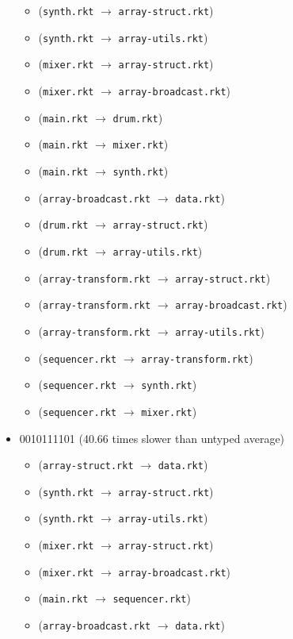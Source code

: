 \documentclass{article}
\newcommand{\mono}[1]{\texttt{#1}}
\begin{document}
\begin{itemize}
\begin{itemize}
  \item (\mono{synth.rkt} $\rightarrow$ \mono{array-struct.rkt})
  \item (\mono{synth.rkt} $\rightarrow$ \mono{array-utils.rkt})
  \item (\mono{mixer.rkt} $\rightarrow$ \mono{array-struct.rkt})
  \item (\mono{mixer.rkt} $\rightarrow$ \mono{array-broadcast.rkt})
  \item (\mono{main.rkt} $\rightarrow$ \mono{drum.rkt})
  \item (\mono{main.rkt} $\rightarrow$ \mono{mixer.rkt})
  \item (\mono{main.rkt} $\rightarrow$ \mono{synth.rkt})
  \item (\mono{array-broadcast.rkt} $\rightarrow$ \mono{data.rkt})
  \item (\mono{drum.rkt} $\rightarrow$ \mono{array-struct.rkt})
  \item (\mono{drum.rkt} $\rightarrow$ \mono{array-utils.rkt})
  \item (\mono{array-transform.rkt} $\rightarrow$ \mono{array-struct.rkt})
  \item (\mono{array-transform.rkt} $\rightarrow$ \mono{array-broadcast.rkt})
  \item (\mono{array-transform.rkt} $\rightarrow$ \mono{array-utils.rkt})
  \item (\mono{sequencer.rkt} $\rightarrow$ \mono{array-transform.rkt})
  \item (\mono{sequencer.rkt} $\rightarrow$ \mono{synth.rkt})
  \item (\mono{sequencer.rkt} $\rightarrow$ \mono{mixer.rkt})
  \end{itemize}
\item 0010111101 (40.66 times slower than untyped average)
  \begin{itemize}
  \item (\mono{array-struct.rkt} $\rightarrow$ \mono{data.rkt})
  \item (\mono{synth.rkt} $\rightarrow$ \mono{array-struct.rkt})
  \item (\mono{synth.rkt} $\rightarrow$ \mono{array-utils.rkt})
  \item (\mono{mixer.rkt} $\rightarrow$ \mono{array-struct.rkt})
  \item (\mono{mixer.rkt} $\rightarrow$ \mono{array-broadcast.rkt})
  \item (\mono{main.rkt} $\rightarrow$ \mono{sequencer.rkt})
  \item (\mono{array-broadcast.rkt} $\rightarrow$ \mono{data.rkt})

\end{itemize}
\end{itemize}
\end{document}
